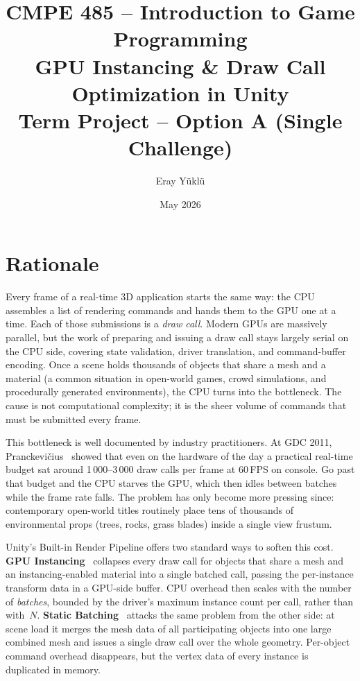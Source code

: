 \documentclass[11pt,a4paper]{article}
\title{%
  \large CMPE 485 -- Introduction to Game Programming\\[4pt]
  \Large\textbf{GPU Instancing \& Draw Call Optimization in Unity}\\[4pt]
  \large Term Project -- Option A (Single Challenge)
}
\author{Eray Y\"ukl\"u}
\date{May 2026}
\begin{document}
\maketitle

\section{Rationale}
\label{sec:rationale}

Every frame of a real-time 3D application starts the same way: the CPU assembles a
list of rendering commands and hands them to the GPU one at a time. Each of those
submissions is a \emph{draw call}. Modern GPUs are massively parallel, but the work
of preparing and issuing a draw call stays largely serial on the CPU side, covering
state validation, driver translation, and command-buffer encoding. Once a scene holds
thousands of objects that share a mesh and a material (a common situation in
open-world games, crowd simulations, and procedurally generated environments), the
CPU turns into the bottleneck. The cause is not computational complexity; it is the
sheer volume of commands that must be submitted every frame.

This bottleneck is well documented by industry practitioners. At GDC 2011,
Pranckevi\v{c}ius~\cite{aras2011batch} showed that even on the hardware of the day a
practical real-time budget sat around 1\,000--3\,000 draw calls per frame at 60\,FPS
on console. Go past that budget and the CPU starves the GPU, which then idles between
batches while the frame rate falls. The problem has only become more pressing since:
contemporary open-world titles routinely place tens of thousands of environmental
props (trees, rocks, grass blades) inside a single view frustum.

Unity's Built-in Render Pipeline offers two standard ways to soften this cost.
\textbf{GPU Instancing}~\cite{unitygpuinstancing} collapses every draw call for
objects that share a mesh and an instancing-enabled material into a single batched
call, passing the per-instance transform data in a GPU-side buffer. CPU overhead then
scales with the number of \emph{batches}, bounded by the driver's maximum instance
count per call, rather than with~$N$. \textbf{Static Batching}~\cite{unitybatching}
attacks the same problem from the other side: at scene load it merges the mesh data of
all participating objects into one large combined mesh and issues a single draw call
over the whole geometry. Per-object command overhead disappears, but the vertex data
of every instance is duplicated in memory.
\end{document}
